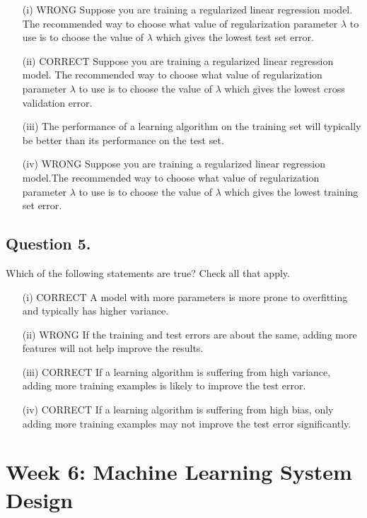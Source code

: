 \documentclass[11pt]{article} %
\begin{document}
\begin{itemize}
	\item[(i)]
WRONG Suppose you are training a regularized linear regression model. The recommended way to choose what value of regularization parameter $\lambda$ to use is to choose the value of $\lambda$ which gives the lowest test set error.
	\item[(ii)]
CORRECT Suppose you are training a regularized linear regression model. The recommended way to choose what value of regularization parameter $\lambda$ to use is to choose the value of $\lambda$ which gives the lowest cross validation error.
	\item[(iii)]
The performance of a learning algorithm on the training set will typically be better than its performance on the test set.
	\item[(iv)]
WRONG Suppose you are training a regularized linear regression model.The recommended way to choose what value of regularization parameter $\lambda$ to use is to choose the value of $\lambda$ which gives the lowest training set error.
\end{itemize}

\subsection*{Question 5. }
Which of the following statements are true? Check all that apply.

\begin{itemize}
	\item[(i)]
CORRECT A model with more parameters is more prone to overfitting and typically has higher variance. 
	\item[(ii)]
WRONG If the training and test errors are about the same, adding more features will not help improve the results. 
	\item[(iii)]
CORRECT If a learning algorithm is suffering from high variance, adding more training examples is likely to improve the test error.
	\item[(iv)]
CORRECT If a learning algorithm is suffering from high bias, only adding more training examples may not improve the test error significantly.
\end{itemize}
\newpage
\section*{Week 6: Machine Learning System Design}
\end{document}
